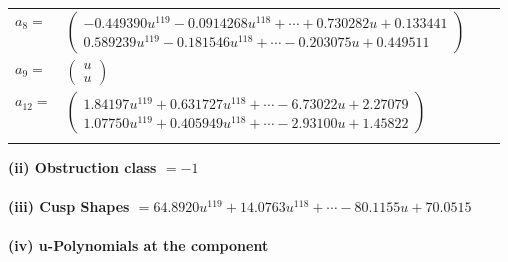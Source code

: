 \documentclass[1p]{elsarticle_modified}
\theoremstyle{definition}
\begin{document}
\begin{tabular}{m{7pt} m{180pt} m{7pt} m{180pt} }
\flushright $a_{8}=$&$\begin{pmatrix}-0.449390 u^{119}-0.0914268 u^{118}+\cdots+0.730282 u+0.133441\\0.589239 u^{119}-0.181546 u^{118}+\cdots-0.203075 u+0.449511\end{pmatrix}$ \\
\flushright $a_{9}=$&$\begin{pmatrix}u\\u\end{pmatrix}$ \\
\flushright $a_{12}=$&$\begin{pmatrix}1.84197 u^{119}+0.631727 u^{118}+\cdots-6.73022 u+2.27079\\1.07750 u^{119}+0.405949 u^{118}+\cdots-2.93100 u+1.45822\end{pmatrix}$\\&\end{tabular}
\flushleft \textbf{(ii) Obstruction class $= -1$}\\~\\
\flushleft \textbf{(iii) Cusp Shapes $= 64.8920 u^{119}+14.0763 u^{118}+\cdots-80.1155 u+70.0515$}\\~\\
\newpage\renewcommand{\arraystretch}{1}
\flushleft \textbf{(iv) u-Polynomials at the component}\newline \\
\end{document}
